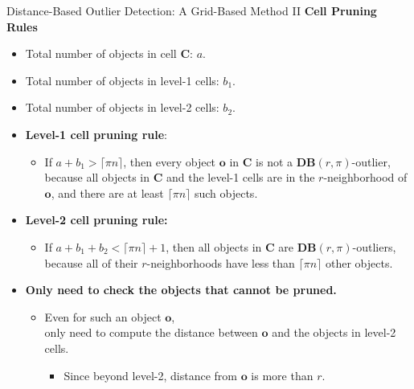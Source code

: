\begin{frame}{Distance-Based Outlier Detection: A Grid-Based Method II}
	\textcolor{faugray}{\textbf{Cell Pruning Rules}}
	\begin{itemize}
		\item Total number of objects in cell $\mathbf{C}$: $a$.
		\item Total number of objects in level-1 cells: $b_1$.
		\item Total number of objects in level-2 cells: $b_2$.
	\end{itemize}
	\begin{itemize}
		\item \textbf{Level-1 cell pruning rule}:
		      \begin{itemize}
			      \item If $a + b_1 > \lceil \pi n \rceil$, then every object $\mathbf{o}$ in $\mathbf{C}$ is not a $\mathbf{DB}(r, \pi)$-outlier, because all objects in $\mathbf{C}$ and the level-1 cells are in the $r$-neighborhood of $\mathbf{o}$, and there are at least $\lceil \pi n \rceil$ such objects.
		      \end{itemize}
		\item \textbf{Level-2 cell pruning rule:}
		      \begin{itemize}
			      \item If $a + b_1 + b_2 < \lceil \pi n \rceil + 1$, then all objects in $\mathbf{C}$ are $\mathbf{DB}(r, \pi)$-outliers, because all of their $r$-neighborhoods have less than $\lceil \pi n \rceil$ other objects.
		      \end{itemize}
		\item \textbf{Only need to check the objects that cannot be pruned.}
		      \begin{itemize}
			      \item Even for such an object $\mathbf{o}$, \\
			            only need to compute the distance between $\mathbf{o}$ and the objects in level-2 cells.
			            \begin{itemize}
				            \item Since beyond level-2, distance from $\mathbf{o}$ is more than $r$.
			            \end{itemize}
		      \end{itemize}
	\end{itemize}
\end{frame}



